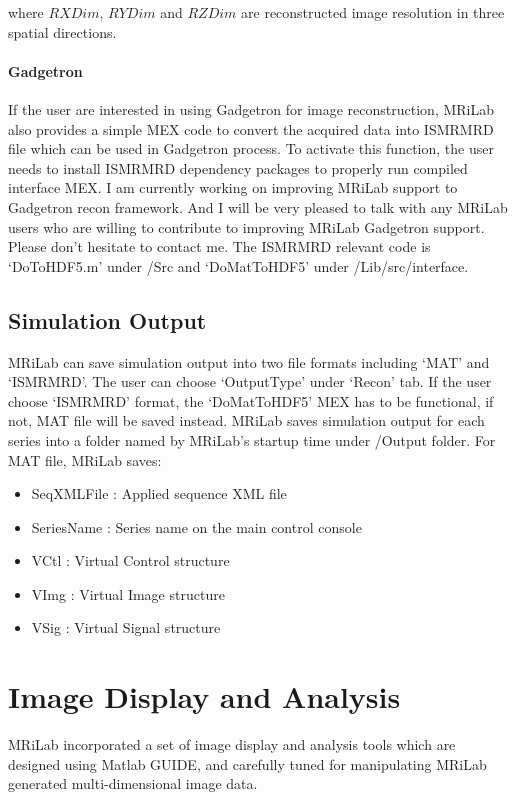 \documentclass{book}%
\begin{document}
where $RXDim$, $RYDim$ and $RZDim$ are reconstructed image resolution in three spatial directions.

\subsubsection{Gadgetron}

If the user are interested in using Gadgetron for image reconstruction, MRiLab also provides a simple MEX code to convert the acquired data into ISMRMRD file which can be used in Gadgetron process. To activate this function, the user needs to install ISMRMRD dependency packages to properly run compiled interface MEX. I am currently working on improving MRiLab support to Gadgetron recon framework. And I will be very pleased to talk with any MRiLab users who are willing to contribute to improving MRiLab Gadgetron support. Please don't hesitate to contact me. The ISMRMRD relevant code is `DoToHDF5.m' under /Src and `DoMatToHDF5' under /Lib/src/interface.

\section{Simulation Output}

MRiLab can save simulation output into two file formats including `MAT' and `ISMRMRD'. The user can choose `OutputType' under `Recon' tab. If the user choose `ISMRMRD' format, the `DoMatToHDF5' MEX has to be functional, if not, MAT file will be saved instead. MRiLab saves simulation output for each series into a folder named by MRiLab's startup time under /Output folder. For MAT file, MRiLab saves:

\begin{itemize}
	\item SeqXMLFile : Applied sequence XML file
	\item SeriesName : Series name on the main control console
	\item VCtl : Virtual Control structure
	\item VImg : Virtual Image structure 
	\item VSig : Virtual Signal structure
\end{itemize}

\chapter{Image Display and Analysis} \label{chap:ImageDisplayAndAnalysis}

MRiLab incorporated a set of image display and analysis tools which are designed using Matlab GUIDE, and carefully tuned for manipulating MRiLab generated multi-dimensional image data.
\end{document}
